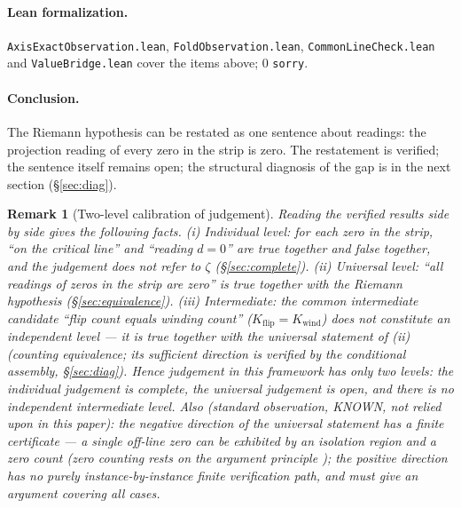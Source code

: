 \documentclass{article}
\renewcommand{\_}{\underscoreOrig\allowbreak}
\newtheorem{remark}[theorem]{Remark}
\newcommand{\zt}{\zeta}
\begin{document}
\paragraph{Lean formalization.} \texttt{AxisExactObservation.lean},
\texttt{FoldObservation.lean}, \texttt{CommonLineCheck.lean} and
\texttt{ValueBridge.lean} cover the items above; 0 \texttt{sorry}.

\paragraph{Conclusion.} The Riemann hypothesis can be restated as one
sentence about readings: the projection reading of every zero in the
strip is zero. The restatement is verified; the sentence itself remains
open; the structural diagnosis of the gap is in the next section
(\S\ref{sec:diag}).

\begin{remark}[Two-level calibration of judgement]
\label{rem:levels}
Reading the verified results side by side gives the following facts.
(i) Individual level: for each zero in the strip, ``on the critical
line'' and ``reading $d=0$'' are true together and false together, and
the judgement does not refer to $\zt$ (\S\ref{sec:complete}).
(ii) Universal level: ``all readings of zeros in the strip are zero'' is
true together with the Riemann hypothesis (\S\ref{sec:equivalence}).
(iii) Intermediate: the common intermediate candidate ``flip count
equals winding count'' ($K_{\mathrm{flip}}=K_{\mathrm{wind}}$) does not
constitute an independent level --- it is true together with the
universal statement of (ii) (counting equivalence; its sufficient
direction is verified by the conditional assembly, \S\ref{sec:diag}).
Hence judgement in this framework has only two levels: the individual
judgement is complete, the universal judgement is open, and there is no
independent intermediate level. Also (standard observation, KNOWN, not
relied upon in this paper): the negative direction of the universal
statement has a finite certificate --- a single off-line zero can be
exhibited by an isolation region and a zero count (zero counting rests
on the argument principle \cite{titchmarsh}); the positive direction has
no purely instance-by-instance finite verification path, and must give
an argument covering all cases.
\end{remark}
\end{document}
